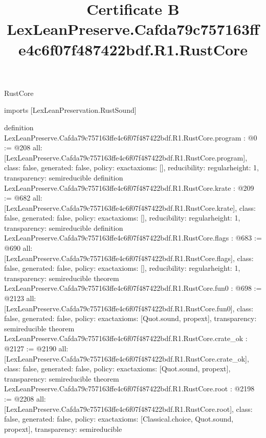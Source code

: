 \begin{lexlean}{RustCore}
\title{Certificate B LexLeanPreserve.Cafda79c757163ffe4c6f07f487422bdf.R1.RustCore}
\begin{coremodule}
imports [LexLeanPreservation.RustSound]

definition LexLeanPreserve.Cafda79c757163ffe4c6f07f487422bdf.R1.RustCore.program : @0 := @208 {
  all: [LexLeanPreserve.Cafda79c757163ffe4c6f07f487422bdf.R1.RustCore.program],
  class: false,
  generated: false,
  policy: exact{axioms: []},
  reducibility: regular{height: 1},
  transparency: semireducible
}
definition LexLeanPreserve.Cafda79c757163ffe4c6f07f487422bdf.R1.RustCore.krate : @209 := @682 {
  all: [LexLeanPreserve.Cafda79c757163ffe4c6f07f487422bdf.R1.RustCore.krate],
  class: false,
  generated: false,
  policy: exact{axioms: []},
  reducibility: regular{height: 1},
  transparency: semireducible
}
definition LexLeanPreserve.Cafda79c757163ffe4c6f07f487422bdf.R1.RustCore.flags : @683 := @690 {
  all: [LexLeanPreserve.Cafda79c757163ffe4c6f07f487422bdf.R1.RustCore.flags],
  class: false,
  generated: false,
  policy: exact{axioms: []},
  reducibility: regular{height: 1},
  transparency: semireducible
}
theorem LexLeanPreserve.Cafda79c757163ffe4c6f07f487422bdf.R1.RustCore.fun0 : @698 := @2123 {
  all: [LexLeanPreserve.Cafda79c757163ffe4c6f07f487422bdf.R1.RustCore.fun0],
  class: false,
  generated: false,
  policy: exact{axioms: [Quot.sound, propext]},
  transparency: semireducible
}
theorem LexLeanPreserve.Cafda79c757163ffe4c6f07f487422bdf.R1.RustCore.crate_ok : @2127 := @2190 {
  all: [LexLeanPreserve.Cafda79c757163ffe4c6f07f487422bdf.R1.RustCore.crate_ok],
  class: false,
  generated: false,
  policy: exact{axioms: [Quot.sound, propext]},
  transparency: semireducible
}
theorem LexLeanPreserve.Cafda79c757163ffe4c6f07f487422bdf.R1.RustCore.root : @2198 := @2208 {
  all: [LexLeanPreserve.Cafda79c757163ffe4c6f07f487422bdf.R1.RustCore.root],
  class: false,
  generated: false,
  policy: exact{axioms: [Classical.choice, Quot.sound, propext]},
  transparency: semireducible
}


\end{coremodule}
\end{lexlean}
